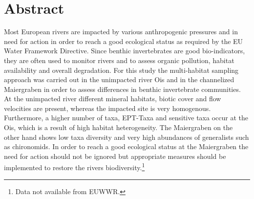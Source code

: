 
\setcounter{secnumdepth}{0}                    %

\section{Abstract}
Most European rivers are impacted by various anthropogenic pressures and in need for action in order to reach a good ecological status as required by the EU Water Framework Directive. Since benthic invertebrates are good bio-indicators, they are often used to monitor rivers and to assess organic pollution, habitat availability and overall degradation. For this study the multi-habitat sampling approach was carried out in the unimpacted river Ois and in the channelized Maiergraben in order to assess differences in benthic invertebrate communities. At the unimpacted river different mineral habitats, biotic cover and flow velocities are present, whereas the impacted site is very homogenous. Furthermore, a higher number of taxa, EPT-Taxa and sensitive taxa occur at the Ois, which is a result of high habitat heterogeneity. The Maiergraben on the other hand shows low taxa diversity and very high abundances of generalists such as chironomids. In order to reach a good ecological status at the Maiergraben the need for action should not be ignored but appropriate measures should be implemented to restore the rivers biodiversity.\footnote{Data not available from EUWWR.}

 